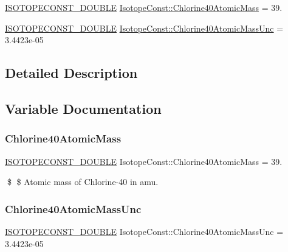 \begin{DoxyCompactItemize}
\item 
\mbox{\hyperlink{group___isotope_const-_macros_ga8f45a7272ce02c0b4c65c44636ed719a}{I\+S\+O\+T\+O\+P\+E\+C\+O\+N\+S\+T\+\_\+\+D\+O\+U\+B\+LE}} \mbox{\hyperlink{group___isotope_const-_chlorine-_cl40_ga2ed64e67f2a6ce7e2fcb829707ff9a0a}{Isotope\+Const\+::\+Chlorine40\+Atomic\+Mass}} = 39.
\item 
\mbox{\hyperlink{group___isotope_const-_macros_ga8f45a7272ce02c0b4c65c44636ed719a}{I\+S\+O\+T\+O\+P\+E\+C\+O\+N\+S\+T\+\_\+\+D\+O\+U\+B\+LE}} \mbox{\hyperlink{group___isotope_const-_chlorine-_cl40_ga920372533d3adc4b497212c084b575d9}{Isotope\+Const\+::\+Chlorine40\+Atomic\+Mass\+Unc}} = 3.\+4423e-\/05
\end{DoxyCompactItemize}


\subsection{Detailed Description}


\subsection{Variable Documentation}
\mbox{\label{group___isotope_const-_chlorine-_cl40_ga2ed64e67f2a6ce7e2fcb829707ff9a0a}} 
\subsubsection{\texorpdfstring{Chlorine40\+Atomic\+Mass}{Chlorine40AtomicMass}}
{\footnotesize\ttfamily \mbox{\hyperlink{group___isotope_const-_macros_ga8f45a7272ce02c0b4c65c44636ed719a}{I\+S\+O\+T\+O\+P\+E\+C\+O\+N\+S\+T\+\_\+\+D\+O\+U\+B\+LE}} Isotope\+Const\+::\+Chlorine40\+Atomic\+Mass = 39.}

\$ \$ Atomic mass of Chlorine-\/40 in amu. \mbox{\label{group___isotope_const-_chlorine-_cl40_ga920372533d3adc4b497212c084b575d9}} 
\subsubsection{\texorpdfstring{Chlorine40\+Atomic\+Mass\+Unc}{Chlorine40AtomicMassUnc}}
{\footnotesize\ttfamily \mbox{\hyperlink{group___isotope_const-_macros_ga8f45a7272ce02c0b4c65c44636ed719a}{I\+S\+O\+T\+O\+P\+E\+C\+O\+N\+S\+T\+\_\+\+D\+O\+U\+B\+LE}} Isotope\+Const\+::\+Chlorine40\+Atomic\+Mass\+Unc = 3.\+4423e-\/05}

